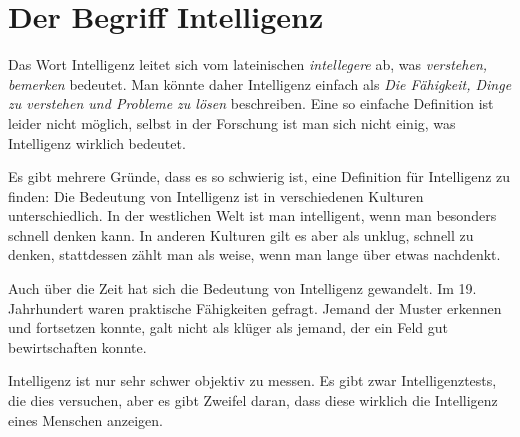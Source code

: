 \chapter{Der Begriff Intelligenz}

Das Wort Intelligenz leitet sich vom lateinischen \emph{intellegere} ab, was \emph{verstehen, bemerken} bedeutet. Man könnte daher Intelligenz einfach als \emph{Die Fähigkeit, Dinge zu verstehen und Probleme zu lösen} beschreiben.
Eine so einfache Definition ist leider nicht möglich, selbst in der Forschung ist man sich nicht einig, was Intelligenz wirklich bedeutet.

Es gibt mehrere Gründe, dass es so schwierig ist, eine Definition für Intelligenz zu finden:
Die Bedeutung von Intelligenz ist in verschiedenen Kulturen unterschiedlich. In der westlichen Welt ist man intelligent, wenn man besonders schnell denken kann. In anderen Kulturen gilt es aber als unklug, schnell zu denken, stattdessen zählt man als weise, wenn man lange über etwas nachdenkt.

Auch über die Zeit hat sich die Bedeutung von Intelligenz gewandelt. Im 19. Jahrhundert waren praktische Fähigkeiten gefragt. Jemand der Muster erkennen und fortsetzen konnte, galt nicht als klüger als jemand, der ein Feld gut bewirtschaften konnte.

Intelligenz ist nur sehr schwer objektiv zu messen. Es gibt zwar Intelligenztests, die dies versuchen, aber es gibt Zweifel daran, dass diese wirklich die Intelligenz eines Menschen anzeigen.
